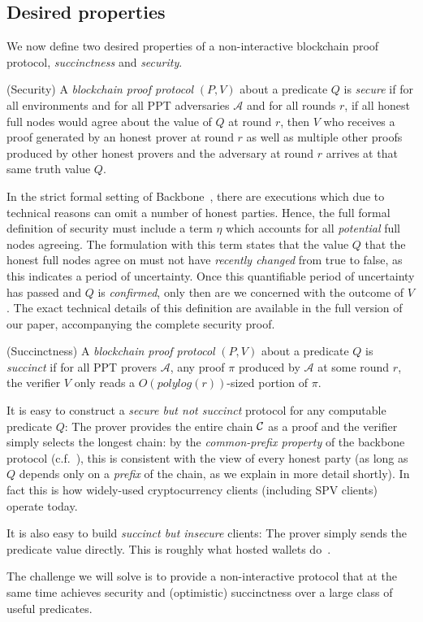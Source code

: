 \subsection{Desired properties}

We now define two desired properties of a non-interactive blockchain proof
protocol, \emph{succinctness} and \emph{security}.

\begin{definition}{(Security)}
A \emph{blockchain proof protocol} $(P, V)$ about a predicate $Q$ is
\emph{secure} if for all environments and for all PPT adversaries $\mathcal{A}$
and for all rounds $r$, if all honest full nodes would agree about the value of
$Q$ at round $r$, then $V$ who receives a proof generated by an honest prover at
round $r$ as well as multiple other proofs produced by other honest provers and
the adversary at round $r$ arrives at that same truth value $Q$.
\end{definition}

\begin{remark}
  In the strict formal setting of Backbone~\cite{backbone}, there are executions
  which due to technical reasons can omit a number of honest parties. Hence, the
  full formal definition of security must include a term $\eta$ which accounts
  for all \emph{potential} full nodes agreeing. The formulation with this term
  states that the value $Q$ that the honest full nodes agree on must not have
  \emph{recently changed} from true to false, as this indicates a period of
  uncertainty. Once this quantifiable period of uncertainty has passed and $Q$
  is \emph{confirmed}, only then are we concerned with the outcome of $V$. The
  exact technical details of this definition are available in the full version
  of our paper, accompanying the complete security proof.
\end{remark}

\begin{definition}{(Succinctness)}
A \emph{blockchain proof protocol} $(P, V)$ about a predicate $Q$ is
\emph{succinct} if for all PPT provers $\mathcal{A}$, any proof $\pi$ produced
by $\mathcal{A}$ at some round $r$, the verifier $V$ only reads a
$O(polylog(r))$-sized portion of $\pi$.
\end{definition}

It is easy to construct a \emph{secure but not succinct} protocol for any
computable predicate $Q$: The prover provides the entire chain $\mathcal{C}$ as a
proof and the verifier simply selects the longest chain: by the
\emph{common-prefix property} of the backbone protocol (c.f.~\cite{backbone}),
this is consistent with the view of every honest party (as long as $Q$ depends
only on a \emph{prefix} of the chain, as we explain in more detail shortly). In
fact this is how widely-used cryptocurrency clients (including SPV clients)
operate today.

It is also easy to build \emph{succinct but insecure} clients: The prover simply
sends the predicate value directly. This is roughly what hosted wallets
do~\cite{sok}.

The challenge we will solve is to provide a non-interactive protocol that at the
same time achieves security and (optimistic) succinctness over a large class of
useful predicates.
